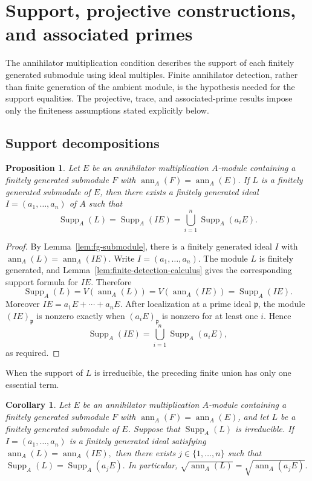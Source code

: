 \documentclass[11pt]{amsart}
\theoremstyle{plain}
\newtheorem{proposition}[theorem]{Proposition}
\newtheorem{corollary}[theorem]{Corollary}
\theoremstyle{definition}
\theoremstyle{remark}
\DeclareMathOperator{\Supp}{Supp}
\newcommand{\ann}{\operatorname{ann}}
\numberwithin{equation}{section}
\begin{document}
\section{Support, projective constructions, and associated primes}
\label{sec:support}

The annihilator multiplication condition describes the support of each
finitely generated submodule using ideal multiples. Finite annihilator
detection, rather than finite generation of the ambient module, is the
hypothesis needed for the support equalities. The projective, trace, and
associated-prime results impose only the finiteness assumptions stated
explicitly below.

\subsection{Support decompositions}

\begin{proposition}
\label{prop:support-decomposition}
Let $E$ be an annihilator multiplication $A$-module containing a
finitely generated submodule $F$ with $\ann_A(F)=\ann_A(E)$. If $L$
is a finitely generated submodule of $E$, then there exists a finitely generated
ideal $I=(a_1,\ldots,a_n)$ of $A$ such that
\[
\Supp_A(L)=\Supp_A(IE)=\bigcup_{i=1}^n \Supp_A(a_iE).
\]
\end{proposition}

\begin{proof}
By Lemma~\ref{lem:fg-submodule}, there is a finitely generated ideal $I$ with
$\ann_A(L)=\ann_A(IE)$. Write $I=(a_1,\ldots,a_n)$. The module $L$ is finitely generated, and
Lemma~\ref{lem:finite-detection-calculus} gives the corresponding support
formula for $IE$. Therefore
\[
\Supp_A(L)=V(\ann_A(L))=V(\ann_A(IE))=\Supp_A(IE).
\]
Moreover $IE=a_1E+\cdots+a_nE$. After localization at a prime ideal
$\mathfrak p$, the module $(IE)_{\mathfrak p}$ is nonzero exactly when
$(a_iE)_{\mathfrak p}$ is nonzero for at least one $i$. Hence
\[
\Supp_A(IE)=\bigcup_{i=1}^n \Supp_A(a_iE),
\]
as required.
\end{proof}

When the support of $L$ is irreducible, the preceding finite union has only one
essential term.

\begin{corollary}
\label{cor:irreducible-support}
Let $E$ be an annihilator multiplication $A$-module containing a
finitely generated submodule $F$ with $\ann_A(F)=\ann_A(E)$, and let
$L$ be a finitely generated submodule of $E$. Suppose that $\Supp_A(L)$ is
irreducible. If $I=(a_1,\ldots,a_n)$ is a finitely generated ideal satisfying
$\ann_A(L)=\ann_A(IE),$
then there exists $j\in\{1,\ldots,n\}$ such that $\Supp_A(L)=\Supp_A(a_jE).$
In particular,
$\sqrt{\ann_A(L)}=\sqrt{\ann_A(a_jE)}.$
\end{corollary}
\end{document}
